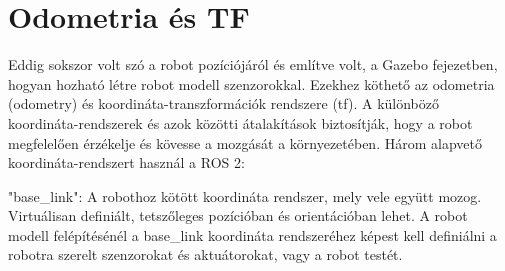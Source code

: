 
\section{Odometria és TF}
Eddig sokszor volt szó a robot pozíciójáról és említve volt, a Gazebo fejezetben, hogyan hozható létre robot modell szenzorokkal. Ezekhez köthető az odometria (odometry) és koordináta-transzformációk rendszere (tf). A különböző koordináta-rendszerek és azok közötti átalakítások biztosítják, hogy a robot megfelelően érzékelje és kövesse a mozgását a környezetében. Három alapvető koordináta-rendszert használ a ROS 2:

"base\_link": A robothoz kötött koordináta rendszer, mely vele együtt mozog. Virtuálisan definiált, tetszőleges pozícióban és orientációban lehet. A robot modell felépítésénél a base\_link koordináta rendszeréhez képest kell definiálni a robotra szerelt szenzorokat és aktuátorokat, vagy a robot testét.

